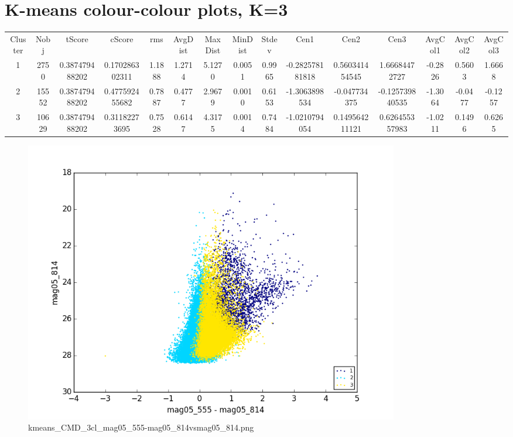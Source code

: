 \documentclass{article}%
\begin{document}
\section*{K{-}means colour{-}colour plots, K=3}%
\begin{table}
\begin{tabular}{ccccccccccccccc}
Cluster & Nobj & tScore & cScore & rms & AvgDist & MaxDist & MinDist & Stdev & Cen1 & Cen2 & Cen3 & AvgCol1 & AvgCol2 & AvgCol3 \\
1 & 2750 & 0.387479488202 & 0.170286302311 & 1.1888 & 1.2714 & 5.1270 & 0.0051 & 0.9965 & -0.282578181818 & 0.560341454545 & 1.66684472727 & -0.2826 & 0.5603 & 1.6668 \\
2 & 15552 & 0.387479488202 & 0.477592455682 & 0.7887 & 0.4777 & 2.9679 & 0.0010 & 0.6153 & -1.3063898534 & -0.047734375 & -0.125739840535 & -1.3064 & -0.0477 & -0.1257 \\
3 & 10629 & 0.387479488202 & 0.31182273695 & 0.7528 & 0.6147 & 4.3175 & 0.0014 & 0.7484 & -1.0210794054 & 0.149564211121 & 0.626455357983 & -1.0211 & 0.1496 & 0.6265 \\
\end{tabular}
\end{table}
%


\begin{figure}%
\centering%
\includegraphics[width=0.8\textwidth]{kmeans_CMD_3cl_mag05_555-mag05_814vsmag05_814.png}%
\caption{kmeans\_CMD\_3cl\_mag05\_555{-}mag05\_814vsmag05\_814.png}%
\end{figure}

%
\end{document}
